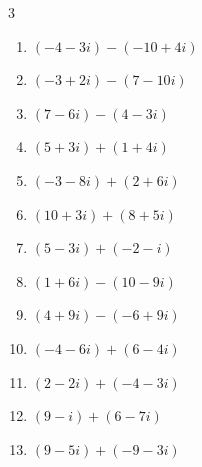 \begin{multicols}{3}
\begin{enumerate}
  \item $\displaystyle (-4-3i) - (-10+4i)$

        \phantom{$\displaystyle =6-7i$}

  \item $\displaystyle (-3+2i) - (7-10i)$

        \phantom{$\displaystyle =-10+12i$}

  \item $\displaystyle (7-6i) - (4-3i)$

        \phantom{$\displaystyle =3-3i$}

  \item $\displaystyle (5+3i) + (1+4i)$

        \phantom{$\displaystyle =6+7i$}

  \item $\displaystyle (-3-8i) + (2+6i)$

        \phantom{$\displaystyle =-1-2i$}

  \item $\displaystyle (10+3i) + (8+5i)$

        \phantom{$\displaystyle =18+8i$}

  \item $\displaystyle (5-3i) + (-2-i)$

        \phantom{$\displaystyle =3-4i$}

  \item $\displaystyle (1+6i) - (10-9i)$

        \phantom{$\displaystyle =-9+15i$}

  \item $\displaystyle (4+9i) - (-6+9i)$

        \phantom{$\displaystyle =10$}

  \item $\displaystyle (-4-6i) + (6-4i)$

        \phantom{$\displaystyle =2-10i$}

  \item $\displaystyle (2-2i) + (-4-3i)$

        \phantom{$\displaystyle =-2-5i$}

\columnbreak %

  \item $\displaystyle (9-i) + (6-7i)$

        \phantom{$\displaystyle =15-8i$}

  \item $\displaystyle (9-5i) + (-9-3i)$


\end{enumerate}
\end{multicols}
